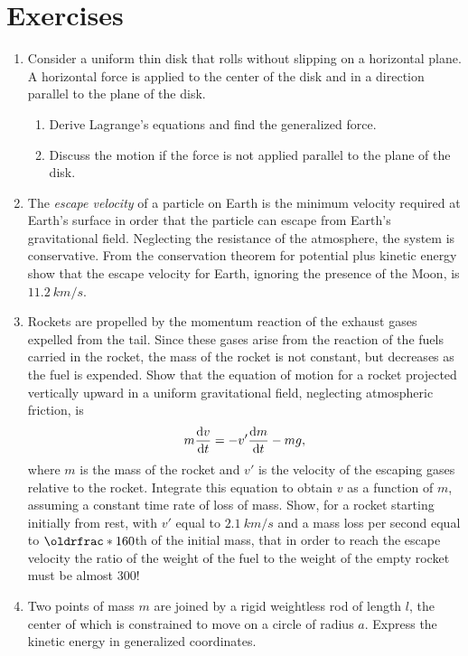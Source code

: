 \section*{Exercises}

\begin{enumerate}[resume]
    \item Consider a uniform thin disk that rolls without slipping on a horizontal plane. A horizontal force is applied to the center of the disk and in a direction parallel to the plane of the disk.
    \begin{enumerate}
        \item Derive Lagrange's equations and find the generalized force.
        \item Discuss the motion if the force is not applied parallel to the plane of the disk.
    \end{enumerate}
    \item The \emph{escape velocity} of a particle on Earth is the minimum velocity required at Earth's surface in order that the particle can escape from Earth's gravitational field. Neglecting the resistance of the atmosphere, the system is conservative. From the conservation theorem for potential plus kinetic energy show that the escape velocity for Earth, ignoring the presence of the Moon, is \(\qty{11.2}{km/s}\).
    \item Rockets are propelled by the momentum reaction of the exhaust gases expelled from the tail. Since these gases arise from the reaction of the fuels carried in the rocket, the mass of the rocket is not constant, but decreases as the fuel is expended. Show that the equation of motion for a rocket projected vertically upward in a uniform gravitational field, neglecting atmospheric friction, is
    \begin{equation*}
        m\odv{v}{t}=-v'\odv{m}{t}-mg,
    \end{equation*}
    where \(m\) is the mass of the rocket and \(v'\) is the velocity of the escaping gases relative to the rocket. Integrate this equation to obtain \(v\) as a function of \(m\), assuming a constant time rate of loss of mass. Show, for a rocket starting initially from rest, with \(v'\) equal to \(\qty{2.1}{km/s}\) and a mass loss per second equal to \(\rfrac{1}{60}\)th of the initial mass, that in order to reach the escape velocity the ratio of the weight of the fuel to the weight of the empty rocket must be almost \(300\)!
    \item Two points of mass \(m\) are joined by a rigid weightless rod of length \(l\), the center of which is constrained to move on a circle of radius \(a\). Express the kinetic energy in generalized coordinates.

\end{enumerate}
